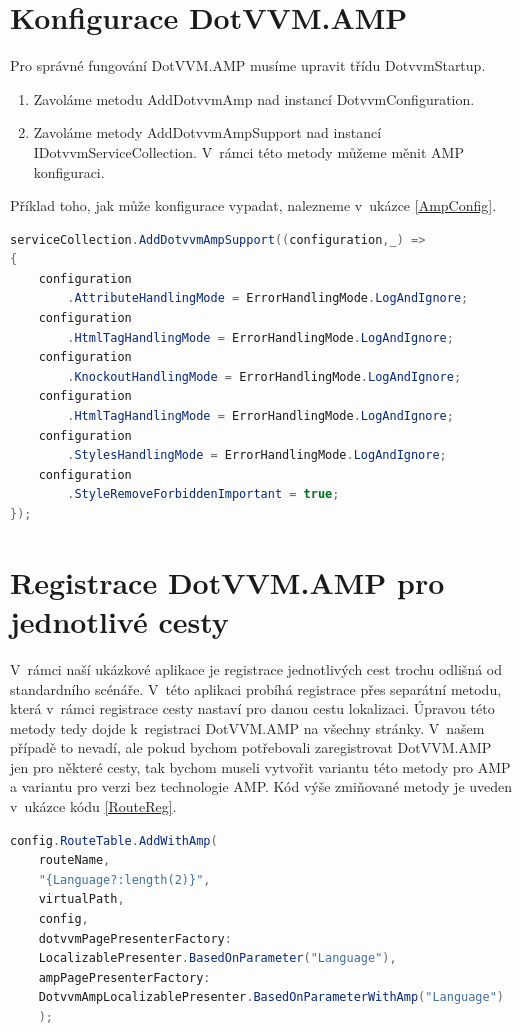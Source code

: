 \section*{Konfigurace DotVVM.AMP}
Pro správné fungování DotVVM.AMP musíme upravit třídu DotvvmStartup.
\begin{enumerate}
    \item  Zavoláme metodu AddDotvvmAmp nad instancí DotvvmConfiguration.
    \item Zavoláme metody AddDotvvmAmpSupport nad instancí IDotvvmServiceCollection.\newline
    V~rámci této metody můžeme měnit AMP konfiguraci.
\end{enumerate}
Příklad toho, jak může konfigurace vypadat, nalezneme v~ukázce \ref{AmpConfig}.

\begin{lstlisting}[language=c#, caption=Ukázka možné AMP konfigurace,label=AmpConfig,captionpos=t]
serviceCollection.AddDotvvmAmpSupport((configuration,_) =>
{
	configuration
	    .AttributeHandlingMode = ErrorHandlingMode.LogAndIgnore;
	configuration
	    .HtmlTagHandlingMode = ErrorHandlingMode.LogAndIgnore;
	configuration
	    .KnockoutHandlingMode = ErrorHandlingMode.LogAndIgnore;
	configuration
	    .HtmlTagHandlingMode = ErrorHandlingMode.LogAndIgnore;
	configuration
	    .StylesHandlingMode = ErrorHandlingMode.LogAndIgnore;
	configuration
	    .StyleRemoveForbiddenImportant = true;
});
\end{lstlisting}

\section{Registrace DotVVM.AMP pro jednotlivé cesty}
V~rámci naší ukázkové aplikace je registrace jednotlivých cest trochu odlišná od standardního scénáře. V~této aplikaci probíhá registrace přes separátní metodu, která v~rámci registrace cesty nastaví pro danou cestu lokalizaci. Úpravou této metody tedy dojde k~registraci DotVVM.AMP na všechny stránky. V~našem případě to nevadí, ale pokud bychom potřebovali zaregistrovat DotVVM.AMP jen pro některé cesty, tak bychom museli vytvořit variantu této metody pro AMP a variantu pro verzi bez technologie AMP. Kód výše zmiňované metody je uveden v~ukázce kódu \ref{RouteReg}. 
\begin{lstlisting}[language=c#, caption=Registrace cesty s~DotVVM.AMP,label=RouteReg,captionpos=t]
config.RouteTable.AddWithAmp(
	routeName,
	"{Language?:length(2)}",
	virtualPath,
	config,
	dotvvmPagePresenterFactory:
	LocalizablePresenter.BasedOnParameter("Language"),
	ampPagePresenterFactory:
	DotvvmAmpLocalizablePresenter.BasedOnParameterWithAmp("Language")
	);

\end{lstlisting}

